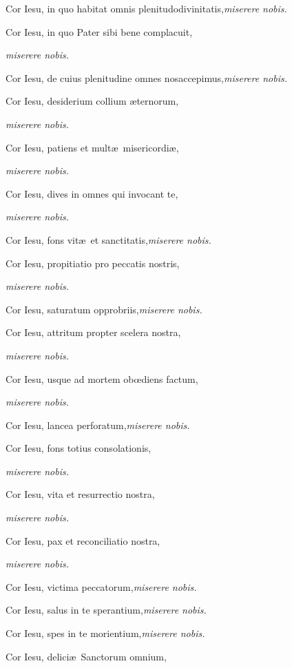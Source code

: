 \documentclass[12pt]{article}\errorcontextlines=9
\begin{document}
\begin{multicols}{2}
Cor Iesu, in quo habitat omnis plenitudo\linebreak divinitatis,\hfill\textit{miserere nobis.}

Cor Iesu, in quo Pater sibi bene complacuit,

\hfill\textit{miserere nobis.}

Cor Iesu, de cuius plenitudine omnes nos\linebreak accepimus,\hfill\textit{miserere nobis.}

Cor Iesu, desiderium collium \ae ternorum,

\hfill\textit{miserere nobis.}

Cor Iesu, patiens et mult\ae\ misericordi\ae,

\hfill\textit{miserere nobis.}

Cor Iesu, dives in omnes qui invocant te,

\hfill\textit{miserere nobis.}

Cor Iesu, fons vit\ae\ et sanctitatis,\hfill\textit{miserere nobis.}

Cor Iesu, propitiatio pro peccatis nostris,

\hfill\textit{miserere nobis.}

Cor Iesu, saturatum opprobriis,\hfill\textit{miserere nobis.}

Cor Iesu, attritum propter scelera nostra,

\hfill\textit{miserere nobis.}

Cor Iesu, usque ad mortem ob\oe diens factum,

\hfill\textit{miserere nobis.}

Cor Iesu, lancea perforatum,\hfill\textit{miserere nobis.}

Cor Iesu, fons totius consolationis,

\hfill\textit{miserere nobis.}

Cor Iesu, vita et resurrectio nostra,

\hfill\textit{miserere nobis.}

Cor Iesu, pax et reconciliatio nostra,

\hfill\textit{miserere nobis.}

Cor Iesu, victima peccatorum,\hfill\textit{miserere nobis.}

Cor Iesu, salus in te sperantium,\hfill\textit{miserere nobis.}

Cor Iesu, spes in te morientium,\hfill\textit{miserere nobis.}

Cor Iesu, delici\ae\ Sanctorum omnium,


\end{multicols}
\end{document}
